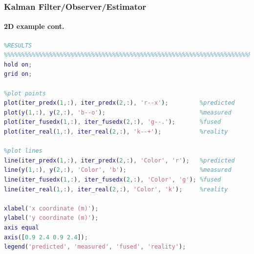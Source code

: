 \begin{frame}[fragile]
\frametitle{Kalman Filter/Observer/Estimator}
\framesubtitle{2D example \tiny cont.}

\tinyvvv \begin{lstlisting}[language=Matlab]
%%%%%%%%%%%%%%%%%%%%%%%%%%%%%%%%%%%%%%%%%%%%%%%%%%%%%%%%%%%%%%%%%%%%%%%%%%%%%%%%%%%%%%%%%
%RESULTS
%%%%%%%%%%%%%%%%%%%%%%%%%%%%%%%%%%%%%%%%%%%%%%%%%%%%%%%%%%%%%%%%%%%%%%%%%%%%%%%%%%%%%%%%%
hold on;
grid on;

%plot points
plot(iter_predx(1,:), iter_predx(2,:), 'r--x');         %predicted
plot(y(1,:), y(2,:), 'b--o');                           %measured
plot(iter_fusedx(1,:), iter_fusedx(2,:), 'g--.');       %fused
plot(iter_real(1,:), iter_real(2,:), 'k--+');           %reality

%plot lines
line(iter_predx(1,:), iter_predx(2,:), 'Color', 'r');   %predicted
line(y(1,:), y(2,:), 'Color', 'b');                     %measured
line(iter_fusedx(1,:), iter_fusedx(2,:), 'Color', 'g'); %fused
line(iter_real(1,:), iter_real(2,:), 'Color', 'k');     %reality

xlabel('x coordinate (m)');
ylabel('y coordinate (m)');
axis equal
axis([0.9 2.4 0.9 2.4]);
legend('predicted', 'measured', 'fused', 'reality');
\end{lstlisting}
\end{frame}



